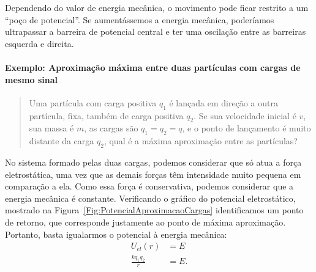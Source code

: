 \begin{marginfigure}
\centering
{}
\caption{Dependendo do valor de energia mecânica, o movimento pode ficar restrito a um ``poço de potencial''. Se aumentássemos a energia mecânica, poderíamos ultrapassar a barreira de potencial central e ter uma oscilação entre as barreiras esquerda e direita. \label{Fig:PocoMoleculaAmonia}}
\end{marginfigure}

\paragraph{Exemplo: Aproximação máxima entre duas partículas com cargas de mesmo sinal}

\begin{quote}
    Uma partícula com carga positiva $q_1$ é lançada em direção a outra partícula, fixa, também de carga positiva $q_2$. Se sua velocidade inicial é $v$, sua massa é $m$, as cargas são $q_1 = q_2 = q$, e o ponto de lançamento é muito distante da carga $q_2$, qual é a máxima aproximação entre as partículas?
\end{quote}

No sistema formado pelas duas cargas, podemos considerar que só atua a força eletrostática, uma vez que as demais forças têm intensidade muito pequena em comparação a ela. Como essa força é conservativa, podemos considerar que a energia mecânica é constante. Verificando o gráfico do potencial eletrostático, mostrado na Figura~\ref{Fig:PotencialAproximacaoCargas} identificamos um ponto de retorno, que corresponde justamente ao ponto de máxima aproximação. Portanto, basta igualarmos o potencial à energia mecânica:
\begin{align}
    U_{el}(r) &= E \\
    \frac{kq_1q_2}{r} &= E.
\end{align}

